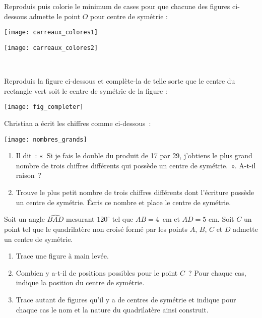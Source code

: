 \begin{exercice}
Reproduis puis colorie le minimum de cases pour que chacune des figures ci-dessous admette le point $O$ pour centre de symétrie :

\begin{minipage}[c]{0.48\linewidth}
\texttt{[image: carreaux\_colores1]}
 \end{minipage} \hfill%
\begin{minipage}[c]{0.48\linewidth}
 \texttt{[image: carreaux\_colores2]}
 \end{minipage} \\

\end{exercice}


\begin{exercice}
Reproduis la figure ci-dessous et complète-la de telle sorte que le centre du rectangle vert soit le centre de symétrie de la figure :
 \begin{center} \texttt{[image: fig\_completer]} \end{center}
\end{exercice}


\begin{exercice}
Christian a écrit les chiffres comme ci-dessous :
 \begin{center} \texttt{[image: nombres\_grands]} \end{center}
 \begin{enumerate}
  \item Il dit : « Si je fais le double du produit de 17 par 29, j'obtiens le plus grand nombre de trois chiffres différents qui possède un centre de symétrie. ». A-t-il raison ? 
  \item Trouve le plus petit nombre de trois chiffres différents dont l'écriture possède un centre de symétrie. Écris ce nombre et place le centre de symétrie.
  \end{enumerate}
\end{exercice}


\begin{exercice}
Soit un angle $\widehat{BAD}$ mesurant $120^\circ$ tel que $AB = 4$ cm et $AD = 5$ cm. Soit $C$ un point tel que le quadrilatère non croisé formé par les points $A$, $B$, $C$ et $D$ admette un centre de symétrie.
\begin{enumerate}
 \item Trace une figure à main levée.
 \item Combien y a-t-il de positions possibles pour le point $C$ ? Pour chaque cas, indique la position du centre de symétrie.
 \item Trace autant de figures qu'il y a de centres de symétrie et indique pour chaque cas le nom et la nature du quadrilatère ainsi construit.
 \end{enumerate}
\end{exercice}


